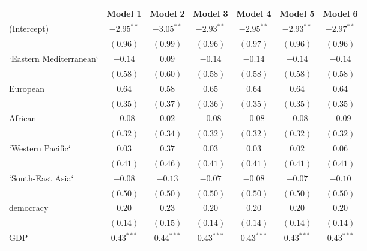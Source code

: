 
\begin{table}[!h]
\begin{center}
\begin{tabular}{l c c c c c c }
\toprule
 & Model 1 & Model 2 & Model 3 & Model 4 & Model 5 & Model 6 \\
\midrule
(Intercept)             & $-2.95^{**}$ & $-3.05^{**}$ & $-2.93^{**}$ & $-2.95^{**}$ & $-2.93^{**}$ & $-2.97^{**}$ \\
                        & $(0.96)$     & $(0.99)$     & $(0.96)$     & $(0.97)$     & $(0.96)$     & $(0.96)$     \\
`Eastern Mediterranean` & $-0.14$      & $0.09$       & $-0.14$      & $-0.14$      & $-0.14$      & $-0.14$      \\
                        & $(0.58)$     & $(0.60)$     & $(0.58)$     & $(0.58)$     & $(0.58)$     & $(0.58)$     \\
European                & $0.64$       & $0.58$       & $0.65$       & $0.64$       & $0.64$       & $0.64$       \\
                        & $(0.35)$     & $(0.37)$     & $(0.36)$     & $(0.35)$     & $(0.35)$     & $(0.35)$     \\
African                 & $-0.08$      & $0.02$       & $-0.08$      & $-0.08$      & $-0.08$      & $-0.09$      \\
                        & $(0.32)$     & $(0.34)$     & $(0.32)$     & $(0.32)$     & $(0.32)$     & $(0.32)$     \\
`Western Pacific`       & $0.03$       & $0.37$       & $0.03$       & $0.03$       & $0.02$       & $0.06$       \\
                        & $(0.41)$     & $(0.46)$     & $(0.41)$     & $(0.41)$     & $(0.41)$     & $(0.41)$     \\
`South-East Asia`       & $-0.08$      & $-0.13$      & $-0.07$      & $-0.08$      & $-0.07$      & $-0.10$      \\
                        & $(0.50)$     & $(0.50)$     & $(0.50)$     & $(0.50)$     & $(0.50)$     & $(0.50)$     \\
democracy               & $0.20$       & $0.23$       & $0.20$       & $0.20$       & $0.20$       & $0.20$       \\
                        & $(0.14)$     & $(0.15)$     & $(0.14)$     & $(0.14)$     & $(0.14)$     & $(0.14)$     \\
GDP                     & $0.43^{***}$ & $0.44^{***}$ & $0.43^{***}$ & $0.43^{***}$ & $0.43^{***}$ & $0.43^{***}$ \\

\end{tabular}
\end{center}
\end{table}
